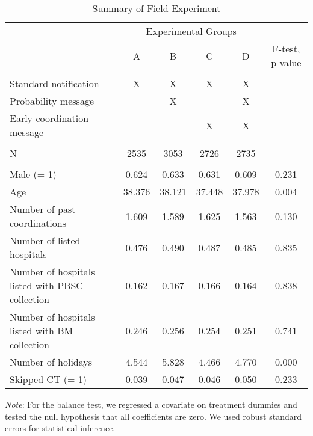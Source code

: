 \documentclass[12pt, a4paper]{article}
\begin{document}
\begin{table}

\caption{\label{tab:summary}Summary of Field Experiment}
\centering
\fontsize{9}{11}\selectfont
\begin{threeparttable}
\begin{tabular}[t]{lccccc}
\toprule
\multicolumn{1}{c}{ } & \multicolumn{4}{c}{Experimental Groups} & \multicolumn{1}{c}{ } \\
\cmidrule(l{3pt}r{3pt}){2-5}
 & A & B & C & D & F-test, p-value\\
\midrule
\addlinespace[0.3em]
\multicolumn{6}{l}{\textbf{A. Interventions}}\\
\hspace{1em}Standard notification & X & X & X & X & \\
\hspace{1em}Probability message &  & X &  & X & \\
\hspace{1em}Early coordination message &  &  & X & X & \\
\addlinespace[0.3em]
\multicolumn{6}{l}{\textbf{B. Sample Size}}\\
\hspace{1em}N & 2535 & 3053 & 2726 & 2735 & \\
\addlinespace[0.3em]
\multicolumn{6}{l}{\textbf{C. Balance Test}}\\
\hspace{1em}Male (= 1) & 0.624 & 0.633 & 0.631 & 0.609 & 0.231\\
\hspace{1em}Age & 38.376 & 38.121 & 37.448 & 37.978 & 0.004\\
\hspace{1em}Number of past coordinations & 1.609 & 1.589 & 1.625 & 1.563 & 0.130\\
\hspace{1em}Number of listed hospitals & 0.476 & 0.490 & 0.487 & 0.485 & 0.835\\
\hspace{1em}Number of hospitals listed with PBSC collection & 0.162 & 0.167 & 0.166 & 0.164 & 0.838\\
\hspace{1em}Number of hospitals listed with BM collection & 0.246 & 0.256 & 0.254 & 0.251 & 0.741\\
\hspace{1em}Number of holidays & 4.544 & 5.828 & 4.466 & 4.770 & 0.000\\
\hspace{1em}Skipped CT (= 1) & 0.039 & 0.047 & 0.046 & 0.050 & 0.233\\
\bottomrule
\end{tabular}
\begin{tablenotes}
\item \emph{Note}: For the balance test, we regressed a covariate on treatment dummies and tested the null hypothesis that all coefficients are zero. We used robust standard errors for statistical inference.
\end{tablenotes}
\end{threeparttable}
\end{table}
\end{document}
